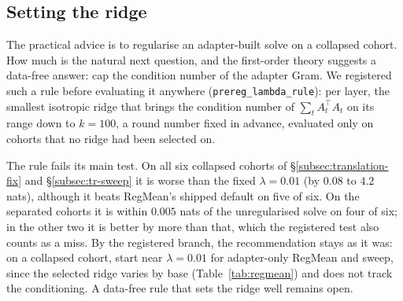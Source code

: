 \subsection{Setting the ridge}
\label{subsec:lambda-rule}

The practical advice is to regularise an adapter-built solve on a collapsed
cohort. How much is the natural next question, and the first-order theory
suggests a data-free answer: cap the condition number of the adapter Gram. We
registered such a rule before evaluating it anywhere
(\texttt{prereg\_lambda\_rule}): per layer, the smallest isotropic ridge that
brings the condition number of $\sum_t A_t^\top A_t$ on its range down to
$k = 100$, a round number fixed in advance, evaluated only on cohorts that no
ridge had been selected on.

The rule fails its main test. On all six collapsed cohorts of
\S\ref{subsec:translation-fix} and \S\ref{subsec:tr-sweep} it is worse than the
fixed $\lambda = 0.01$ (by $0.08$ to $4.2$ nats), although it beats RegMean's
shipped default on five of six. On the separated cohorts it is within $0.005$
nats of the unregularised solve on four of six; in the other two it is better by
more than that, which the registered test also counts as a miss. By the
registered branch, the recommendation stays as it was: on a collapsed cohort,
start near $\lambda = 0.01$ for adapter-only RegMean and sweep, since the
selected ridge varies by base (Table~\ref{tab:regmean}) and does not track the
conditioning. A data-free rule that sets the ridge well remains open.
